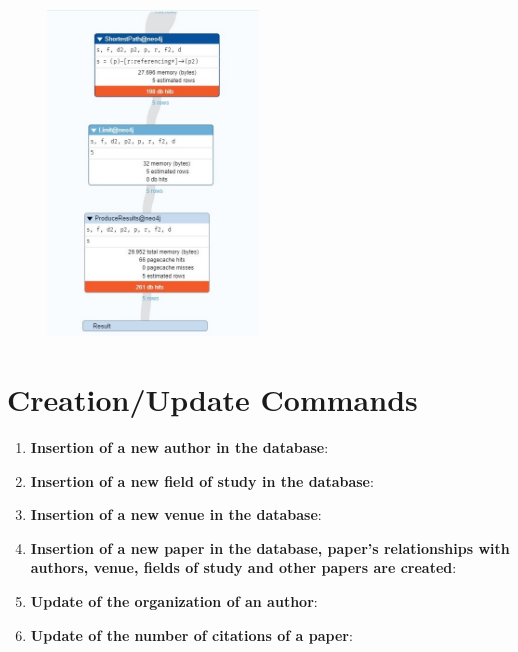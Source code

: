 \documentclass{Configuration_Files/PoliMi3i_thesis}
\begin{document}
\begin{enumerate}
\begin{figure}[H]
    \end{figure}
    \begin{figure}[H]
    \centering
     \includegraphics[width=0.5\textwidth]{Images/queries/query_10_p3.jpg}
     \end{figure}
\end{enumerate}
\section{Creation/Update Commands}
\begin{enumerate}
\item \textbf{Insertion of a new author in the database}:
    
\item \textbf{Insertion of a new field of study in the database}:
    
\item \textbf{Insertion of a new venue in the database}:
    
\item \textbf{Insertion of a new paper in the database, paper's relationships with authors, venue, fields of study and other papers are created}:
    
\item \textbf{Update of the organization of an author}:
    
\item \textbf{Update of the number of citations of a paper}:
    
\end{enumerate}
\end{document}
